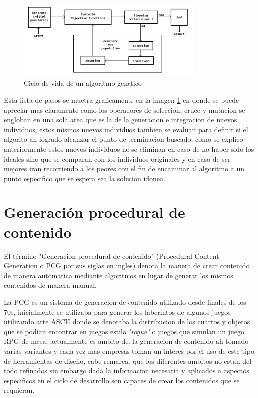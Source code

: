 \begin{figure}
    \centering
    \includegraphics[width=0.8\textwidth]{img/ga_life_cycle.png}
    \caption{Ciclo de vida de un algoritmo genetico}
    \label{figure:GA-Cycle}
\end{figure}

Esta lista de pasos se muetra graficamente en la imagen \ref{figure:GA-Cycle} en
donde se puede apreciar mas claramente como los operadores de seleccion, cruce y
mutacion se engloban en una sola area que es la de la generacion e integracion
de nuevos individuos, estos mismos nuevos individuos tambien se evaluan para
definir si el algorito ah logrado alcanzar el punto de terminacion buscado, como
se explico anteriormente estos nuevos individuos no se eliminan en caso de no
haber sido los ideales sino que se comparan con los individuos originales y en
caso de ser mejores iran recorriendo a los peores con el fin de encaminar al
algoritmo a un punto especifico que se espera sea la solucion idonea.

\section{Generación procedural de contenido}
\label{section:PCG}

El término "Generacion procedural de contenido" (Procedural Content Generation o
PCG por sus siglas en ingles) denota la manera de crear contenido de manera
automatica mediante algoritmos en lugar de generar los mismos contenidos de
manera manual.

La PCG es un sistema de generacion de contenido utilizado desde finales de los
70s, inicialmente se utilizaba para generar los laberintos de algunos juegos
utilizando arte ASCII donde se denotaba la distribucion de los cuartos y objetos
que se podian encontrar en juegos estilo \textit{"rogue"} o juegos que simulan
un juego RPG de mesa, actualmente es ambito del la generacion de contenido ah
tomado varias variantes y cada vez mas empresas toman un interes por el uso de
este tipo de herramientas de diseño, cabe remarcar que los diferentes ambitos no
estan del todo refinados sin embargo dada la informacion necesaria y aplicados a
aspectos especificos en el ciclo de desarrollo son capaces de crear los
contenidos que se requieran.

